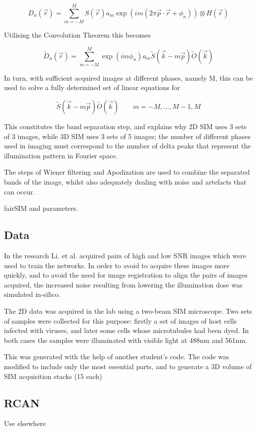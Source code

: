 \documentclass[12pt]{article}
\begin{document}
\[D_n(\vec{r}) = \sum_{m=-M}^{M}{S(\vec{r})a_m\exp(im(2\pi\vec{p}\cdot\vec{r}+\phi_n))\otimes H(\vec{r})}\]

Utilising the Convolution Theorem this becomes

\[\tilde{D}_n(\vec{r}) = \sum_{m=-M}^{M}{\exp(im\phi_n)a_m\tilde{S}(\vec{k}-m\vec{p})\tilde{O}(\vec{k})}\]

In turn, with sufficient acquired images at different phases, namely M, this can be used to solve a fully determined set of linear equations for

\[\tilde{S}(\vec{k}-m\vec{p})\tilde{O}(\vec{k})\qquad m=-M,\dots,M-1,M\]

This constitutes the band separation step, and explains why 2D SIM uses 3 sets of 3 images, while 3D SIM uses 3 sets of 5 images;
the number of different phases used in imaging must correspond to the number of delta peaks that represent the illumination pattern in Fourier space.

The steps of Wiener filtering and Apodization are used to combine the separated bands of the image,
whilst also adequately dealing with noise and artefacts that can occur.

fairSIM and parameters.

\subsection{Data}

In the research Li. et al. acquired pairs of high and low SNR images which were used to train the networks.
In order to avoid to acquire these images more quickly, and to avoid the need for image registration to align the pairs of images acquired,
the increased noise resulting from lowering the illumination dose was simulated in-silico.

The 2D data was acquired in the lab using a two-beam SIM microscope.
Two sets of samples were collected for this purpose: firstly a set of images of host cells infected with viruses,
and later some cells whose microtubules had been dyed.
In both cases the samples were illuminated with visible light at 488nm and 561nm.

This was generated with the help of another student's code.
The code was modified to include only the most essential parts, and to generate a 3D volume of SIM acquisition stacks (15 each)

\subsection{RCAN}
Use elsewhere
\end{document}
